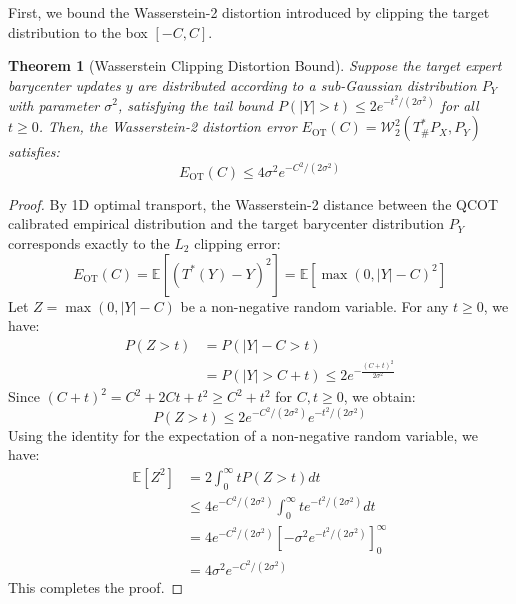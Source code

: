 \documentclass{article}
\theoremstyle{plain}
\newtheorem{theorem}{Theorem}[section]
\theoremstyle{definition}
\theoremstyle{remark}
\begin{document}
First, we bound the Wasserstein-2 distortion introduced by clipping the target distribution to the box $[-C, C]$.
\begin{theorem}[Wasserstein Clipping Distortion Bound]
Suppose the target expert barycenter updates $y$ are distributed according to a sub-Gaussian distribution $P_Y$ with parameter $\sigma^2$, satisfying the tail bound $P(|Y| > t) \le 2 e^{-t^2 / (2\sigma^2)}$ for all $t \ge 0$. Then, the Wasserstein-2 distortion error $E_{\text{OT}}(C) = \mathcal{W}_2^2(T^*_{\#} P_X, P_Y)$ satisfies:
\begin{equation}
    E_{\text{OT}}(C) \le 4\sigma^2 e^{-C^2 / (2\sigma^2)}
\end{equation}
\label{thm:clipping_error}
\end{theorem}

\begin{proof}
By 1D optimal transport, the Wasserstein-2 distance between the QCOT calibrated empirical distribution and the target barycenter distribution $P_Y$ corresponds exactly to the $L_2$ clipping error:
\begin{equation}
    E_{\text{OT}}(C) = \mathbb{E}[(T^*(Y) - Y)^2] = \mathbb{E}[\max(0, |Y| - C)^2]
\end{equation}
Let $Z = \max(0, |Y| - C)$ be a non-negative random variable. For any $t \ge 0$, we have:
\begin{align}
    P(Z > t) &= P(|Y| - C > t) \nonumber \\
    &= P(|Y| > C + t) \le 2 e^{-\frac{(C+t)^2}{2\sigma^2}}
\end{align}
Since $(C+t)^2 = C^2 + 2Ct + t^2 \ge C^2 + t^2$ for $C, t \ge 0$, we obtain:
\begin{equation}
    P(Z > t) \le 2 e^{-C^2 / (2\sigma^2)} e^{-t^2 / (2\sigma^2)}
\end{equation}
Using the identity for the expectation of a non-negative random variable, we have:
\begin{align}
    \mathbb{E}[Z^2] &= 2 \int_{0}^{\infty} t P(Z > t) dt \nonumber \\
    &\le 4 e^{-C^2 / (2\sigma^2)} \int_{0}^{\infty} t e^{-t^2 / (2\sigma^2)} dt \nonumber \\
    &= 4 e^{-C^2 / (2\sigma^2)} \left[ -\sigma^2 e^{-t^2 / (2\sigma^2)} \right]_0^{\infty} \nonumber \\
    &= 4\sigma^2 e^{-C^2 / (2\sigma^2)}
\end{align}
This completes the proof.
\end{proof}
\end{document}
